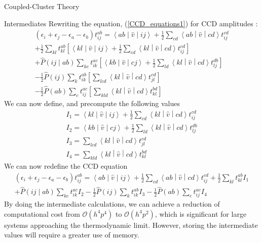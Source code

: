 \documentclass[twoside,english]{uiofysmaster}
\begin{document}
\begin{chapter}{Coupled-Cluster Theory}
\begin{section}{Intermediates}
  		Rewriting the equation, (\ref{CCD_equations1}) for CCD amplitudes \cite{Baardsen,Audun}:
  		\begin{align}
  			(\epsilon_i + \epsilon_j - \epsilon_a - \epsilon_b) t_{ij}^{ab} = \left<ab\middle|\hat v\middle|ij\right> + \frac{1}{2} \sum_{cd}\left<ab\middle|\hat v\middle|cd\right>t_{ij}^{cd} \\
  			+ \frac{1}{2} \sum_{kl} t_{kl}^{ab} \left[ \left<kl\middle|\hat v\middle|ij\right> + \frac{1}{2} \sum_{cd} \left<kl\middle|\hat v\middle|cd\right> t_{ij}^{cd} \right] \\
  			+ \hat P\left(ij\middle|ab\right) \sum_{kc} t_{ik}^{ac} \left[ \left<kb\middle|\hat v\middle|cj\right> + \frac{1}{2}\sum_{ld}\left<kl\middle|\hat v\middle|cd\right>t_{lj}^{db} \right] \\
  			- \frac{1}{2} \hat P(ij) \sum_{k} t_{ik}^{ab} \left[ \sum_{lcd} \left<kl\middle|\hat v\middle|cd\right> t_{jl}^{cd} \right] \\
  			- \frac{1}{2} \hat P(ab) \sum_{c} t_{ij}^{ac} \left[ \sum_{kld} \left<kl\middle|\hat v\middle|cd\right> t_{kl}^{bd} \right]
  		\end{align}
  		We can now define, and precompute the following values
  		\begin{align}
  			I_1 = \left<kl\middle|\hat v\middle|ij\right> + \frac{1}{2} \sum_{cd} \left<kl\middle|\hat v\middle|cd\right> t_{ij}^{cd} \\
  			I_2 = \left<kb\middle|\hat v\middle|cj\right> + \frac{1}{2}\sum_{ld}\left<kl\middle|\hat v\middle|cd\right>t_{lj}^{db} \\
  			I_3 = \sum_{lcd} \left<kl\middle|\hat v\middle|cd\right> t_{jl}^{cd} \\
  			I_4 = \sum_{kld} \left<kl\middle|\hat v\middle|cd\right> t_{kl}^{bd}
  		\end{align}
  		We can now redefine the CCD equation 
  		\begin{align}
  			(\epsilon_i + \epsilon_j - \epsilon_a - \epsilon_b) t_{ij}^{ab} = \left<ab\middle|\hat v\middle|ij\right> + \frac{1}{2} \sum_{cd}\left<ab\middle|\hat v\middle|cd\right>t_{ij}^{cd} + \frac{1}{2} \sum_{kl} t_{kl}^{ab} I_1 \\
  			+ \hat P\left(ij\middle|ab\right) \sum_{kc} t_{ik}^{ac} I_2 - \frac{1}{2} \hat P(ij) \sum_{k} t_{ik}^{ab} I_3  - \frac{1}{2} \hat P(ab) \sum_{c} t_{ij}^{ac} I_4
  			\label{Intermediates}
  		\end{align}
  		By doing the intermediate calculations, we can achieve a reduction of computational cost from $\mathcal{O}(h^4 p^4)$ to $\mathcal{O}(h^4 p^2)$, which is significant for large systems approaching the thermodynamic limit. However, storing the intermediate values will require a greater use of memory. 

  	\end{section}

\end{chapter}
\end{document}
